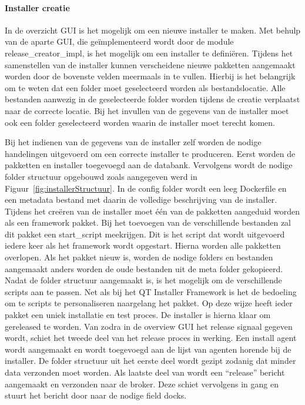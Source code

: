 \paragraph{Installer creatie}
In de overzicht GUI is het mogelijk om een nieuwe installer te maken.
Met behulp van de aparte GUI, die geïmplementeerd wordt door de module release\_creator\_impl, is het mogelijk om een installer te definiëren.
Tijdens het samenstellen van de installer kunnen verscheidene nieuwe pakketten aangemaakt worden door de bovenste velden meermaals in te vullen.
Hierbij is het belangrijk om te weten dat een folder moet geselecteerd worden als bestandslocatie.
Alle bestanden aanwezig in de geselecteerde folder worden tijdens de creatie verplaatst naar de correcte locatie.
Bij het invullen van de gegevens van de installer moet ook een folder geselecteerd worden waarin de installer moet terecht komen.

Bij het indienen van de gegevens van de installer zelf worden de nodige handelingen uitgevoerd om een correcte installer te produceren.
Eerst worden de pakketten en installer toegevoegd aan de databank.
Vervolgens wordt de nodige folder structuur opgebouwd zoals aangegeven werd in Figuur~\vref{fig:installerStructuur}.
In de config folder wordt een leeg Dockerfile en een metadata bestand met daarin de volledige beschrijving van de installer.
Tijdens het creëren van de installer moet één van de pakketten aangeduid worden als een framework pakket.
Bij het toevoegen van de verschillende bestanden zal dit pakket een start\_script meekrijgen.
Dit is het script dat wordt uitgevoerd iedere keer als het framework wordt opgestart.
Hierna worden alle pakketten overlopen.
Als het pakket nieuw is, worden de nodige folders en bestanden aangemaakt anders worden de oude bestanden uit de meta folder gekopieerd.
Nadat de folder structuur aangemaakt is, is het mogelijk om de verschillende scripts aan te passen.
Net als bij het QT Installer Framework is het de bedoeling om te scripts te personaliseren naargelang het pakket.
Op deze wijze heeft ieder pakket een uniek installatie en test proces.
De installer is hierna klaar om gereleased te worden.
Van zodra in de overview GUI het release signaal gegeven wordt, schiet het tweede deel van het release proces in werking.
Een install agent wordt aangemaakt en wordt toegevoegd aan de lijst van agenten horende bij de installer.
De folder structuur uit het eerste deel wordt gezipt zodanig dat minder data verzonden moet worden.
Als laatste deel van wordt een ``release'' bericht aangemaakt en verzonden naar de broker.
Deze schiet vervolgens in gang en stuurt het bericht door naar de nodige field docks.

